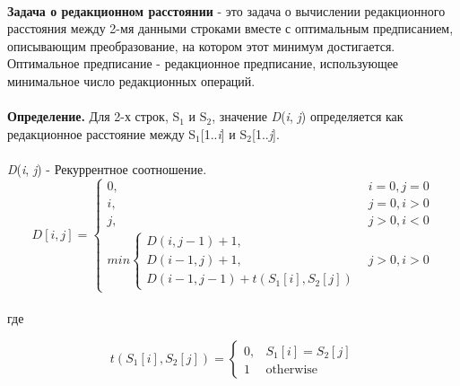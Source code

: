 \\
\textbf{Задача о редакционном расстоянии} - это задача о вычислении редакционного расстояния между 2-мя данными строками вместе с оптимальным  предписанием, описывающим преобразование, на котором этот минимум достигается. Оптимальное предписание - редакционное предписание, использующее минимальное число редакционных операций. \\
\\
\textbf{Определение.} Для 2-х строк, S$_1$ и S$_2$, значение \textit{D}(\textit{i}, \textit{j}) определяется как редакционное	расстояние между S$_1$[1..\textit{i}] и S$_2$[1..\textit{j}]. \\
\\
\textit{D}(\textit{i}, \textit{j}) - Рекуррентное соотношение. \\

\begin{displaymath}
D[i,j] = \left\{
\begin{array}{ll}
0, & i = 0, j = 0 \\
i, & j = 0, i > 0 \\
j, & j > 0, i < 0 \\
min\left\{
\begin{array}{ll}
D(i,j - 1) + 1, \\
D(i - 1,j) + 1, \\
D(i - 1,j - 1) + t(S_1[i],S_2[j])
\end{array}
\right.
& j > 0, i > 0
\end{array}
\right.
\end{displaymath}
\\
где

\begin{displaymath}
t(S_1[i],S_2[j]) = \left\{
\begin{array}{ll}
0, & S_1[i] = S_2[j] \\
1 & \text{otherwise}
\end{array}
\right.
\end{displaymath}